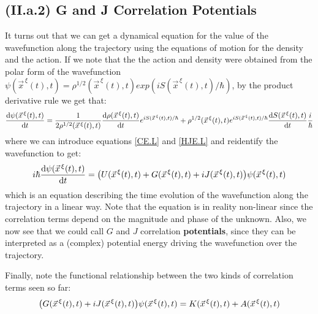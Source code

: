 \documentclass[11pt, a4paper]{article} %
\begin{document}
\subsection*{(II.a.2) G and J Correlation Potentials}
It turns out that we can get a dynamical equation for the value of the wavefunction along the trajectory using the equations of motion for the density and the action. If we note that the the action and density were obtained from the polar form of the wavefunction $\psi(\vec{x}^{\, \xi}(t),t)=\rho^{1/2}(\vec{x}^{\, \xi}(t),t)exp(iS(\vec{x}^{\, \xi}(t),t)/\hbar)$, by the product derivative rule we get that:
\begin{equation}
\dv{\psi(\vec{x}^{\, \xi}(t),t)}{t}=\frac{1}{2\rho^{1/2}(\vec{x}^{\, \xi}(t),t)}\dv{\rho(\vec{x}^{\, \xi}(t),t)}{t}e^{iS(\vec{x}^{\, \xi}(t),t)/\hbar}+\rho^{1/2}(\vec{x}^{\, \xi}(t),t)e^{iS(\vec{x}^{\, \xi}(t),t)/\hbar}\dv{S(\vec{x}^{\, \xi}(t),t)}{t}\frac{i}{\hbar}
\end{equation}
where we can introduce equations \eqref{CE.L} and \eqref{HJE.L} and reidentify the wavefunction to get:
\begin{equation}
i\hbar \dv{\psi(\vec{x}^{\, \xi}(t),t)}{t}=\qty(U(\vec{x}^{\, \xi}(t),t)+G(\vec{x}^{\, \xi}(t),t)+iJ(\vec{x}^{\, \xi}(t),t))\psi(\vec{x}^{\, \xi}(t),t)
\end{equation}
which is an equation describing the time evolution of the wavefunction along the trajectory in a linear way. Note that the equation is in reality non-linear since the correlation terms depend on the magnitude and phase of the unknown. Also, we now see that we could call $G$ and $J$ correlation {\bf potentials}, since they can be interpreted as a (complex) potential energy driving the wavefunction over the trajectory.

Finally, note the functional relationship between the two kinds of correlation terms seen so far:
\begin{equation}
\qty(G(\vec{x}^{\, \xi}(t),t)+iJ(\vec{x}^{\, \xi}(t),t))\psi(\vec{x}^{\, \xi}(t),t)=K(\vec{x}^{\, \xi}(t),t)+A(\vec{x}^{\, \xi}(t),t)
\end{equation}
\end{document}
